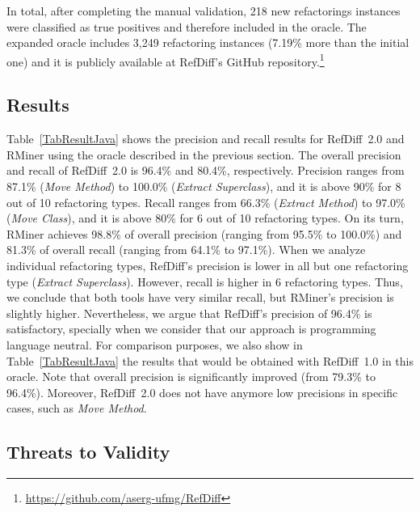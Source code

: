 In total, after completing the manual validation, 218 new refactorings instances were classified as true positives and therefore included in the oracle.
The expanded oracle includes 3,249 refactoring instances (7.19\% more than the initial one) and it is publicly available at RefDiff's GitHub repository.\footnote{\url{https://github.com/aserg-ufmg/RefDiff}}

\subsection{Results}
\label{sec:eval:java:results}



Table~\ref{TabResultJava} shows the precision and recall results for RefDiff~2.0 and RMiner using the oracle described in the previous section. The overall precision and recall of RefDiff~2.0 is 96.4\% and 80.4\%, respectively.
Precision ranges from 87.1\% (\emph{Move Method}) to 100.0\% (\emph{Extract Superclass}), and it is above 90\% for 8 out of 10 refactoring types.
Recall ranges from 66.3\% (\emph{Extract Method}) to 97.0\% (\emph{Move Class}), and it is above 80\% for 6 out of 10 refactoring types.
On its turn, RMiner achieves 98.8\% of overall precision (ranging from 95.5\% to 100.0\%) and 81.3\% of overall recall (ranging from 64.1\% to 97.1\%).
When we analyze individual refactoring types, RefDiff's precision is lower in all but one refactoring type (\emph{Extract Superclass}). However, recall is higher in 6 refactoring types.
Thus, we conclude that both tools have very similar recall, but RMiner's precision is slightly higher.
Nevertheless, we argue that RefDiff's precision of 96.4\% is satisfactory, specially when we consider that our approach is programming language neutral.
For comparison purposes, we also show in Table~\ref{TabResultJava} the results that would be obtained with RefDiff~1.0 in this oracle. Note that overall precision is significantly improved (from 79.3\% to 96.4\%). Moreover, RefDiff~2.0 does not have anymore low precisions in specific cases, such as \emph{Move Method}.



\subsection{Threats to Validity}
\label{SecThreatsJava}

